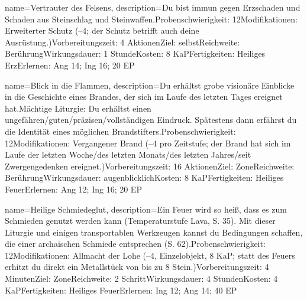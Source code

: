 {
    name={Vertrauter des Felsens},
    description={Du bist immun gegen Erzschaden und Schaden aus Steinschlag und Steinwaffen.\newline Probenschwierigkeit: 12\newline Modifikationen: Erweiterter Schutz (–4; der Schutz betrifft auch deine Ausrüstung.)\newline Vorbereitungszeit: 4 Aktionen\newline Ziel: selbst\newline Reichweite: Berührung\newline Wirkungsdauer: 1 Stunde\newline Kosten: 8 KaP\newline Fertigkeiten: Heiliges Erz\newline Erlernen: Ang 14; Ing 16; 20 EP}
}


{
    name={Blick in die Flammen},
    description={Du erhältst grobe visionäre Einblicke in die Geschichte eines Brandes, der sich im Laufe des letzten Tages ereignet hat.\newline Mächtige Liturgie: Du erhältst einen ungefähren/guten/präzisen/vollständigen Eindruck. Spätestens dann erfährst du die Identität eines möglichen Brandstifters.\newline Probenschwierigkeit: 12\newline Modifikationen: Vergangener Brand (–4 pro Zeitstufe; der Brand hat sich im Laufe der letzten Woche/des letzten Monats/des letzten Jahres/seit Zwergengedenken ereignet.)\newline Vorbereitungszeit: 16 Aktionen\newline Ziel: Zone\newline Reichweite: Berührung\newline Wirkungsdauer: augenblicklich\newline Kosten: 8 KaP\newline Fertigkeiten: Heiliges Feuer\newline Erlernen: Ang 12; Ing 16; 20 EP}
}


{
    name={Heilige Schmiedeglut},
    description={Ein Feuer wird so heiß, dass es zum Schmieden genutzt werden kann (Temperaturstufe Lava, S. 35). Mit dieser Liturgie und einigen transportablen Werkzeugen kannst du Bedingungen schaffen, die einer archaischen Schmiede entsprechen (S. 62).\newline Probenschwierigkeit: 12\newline Modifikationen: Allmacht der Lohe (–4, Einzelobjekt, 8 KaP; statt des Feuers erhitzt du direkt ein Metallstück von bis zu 8 Stein.)\newline Vorbereitungszeit: 4 Minuten\newline Ziel: Zone\newline Reichweite: 2 Schritt\newline Wirkungsdauer: 4 Stunden\newline Kosten: 4 KaP\newline Fertigkeiten: Heiliges Feuer\newline Erlernen: Ing 12; Ang 14; 40 EP}
}


